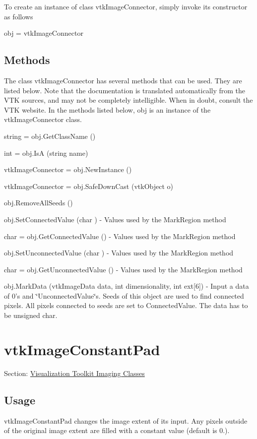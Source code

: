 To create an instance of class vtk\-Image\-Connector, simply invoke its constructor as follows \begin{DoxyVerb}  obj = vtkImageConnector
\end{DoxyVerb}
 \hypertarget{vtkwidgets_vtkxyplotwidget_Methods}{}\subsection{Methods}\label{vtkwidgets_vtkxyplotwidget_Methods}
The class vtk\-Image\-Connector has several methods that can be used. They are listed below. Note that the documentation is translated automatically from the V\-T\-K sources, and may not be completely intelligible. When in doubt, consult the V\-T\-K website. In the methods listed below, {\ttfamily obj} is an instance of the vtk\-Image\-Connector class. 
\begin{DoxyItemize}
\item {\ttfamily string = obj.\-Get\-Class\-Name ()}  
\item {\ttfamily int = obj.\-Is\-A (string name)}  
\item {\ttfamily vtk\-Image\-Connector = obj.\-New\-Instance ()}  
\item {\ttfamily vtk\-Image\-Connector = obj.\-Safe\-Down\-Cast (vtk\-Object o)}  
\item {\ttfamily obj.\-Remove\-All\-Seeds ()}  
\item {\ttfamily obj.\-Set\-Connected\-Value (char )} -\/ Values used by the Mark\-Region method  
\item {\ttfamily char = obj.\-Get\-Connected\-Value ()} -\/ Values used by the Mark\-Region method  
\item {\ttfamily obj.\-Set\-Unconnected\-Value (char )} -\/ Values used by the Mark\-Region method  
\item {\ttfamily char = obj.\-Get\-Unconnected\-Value ()} -\/ Values used by the Mark\-Region method  
\item {\ttfamily obj.\-Mark\-Data (vtk\-Image\-Data data, int dimensionality, int ext\mbox{[}6\mbox{]})} -\/ Input a data of 0's and \char`\"{}\-Unconnected\-Value\char`\"{}s. Seeds of this object are used to find connected pixels. All pixels connected to seeds are set to Connected\-Value. The data has to be unsigned char.  
\end{DoxyItemize}\hypertarget{vtkimaging_vtkimageconstantpad}{}\section{vtk\-Image\-Constant\-Pad}\label{vtkimaging_vtkimageconstantpad}
Section\-: \hyperlink{sec_vtkimaging}{Visualization Toolkit Imaging Classes} \hypertarget{vtkwidgets_vtkxyplotwidget_Usage}{}\subsection{Usage}\label{vtkwidgets_vtkxyplotwidget_Usage}
vtk\-Image\-Constant\-Pad changes the image extent of its input. Any pixels outside of the original image extent are filled with a constant value (default is 0.).

